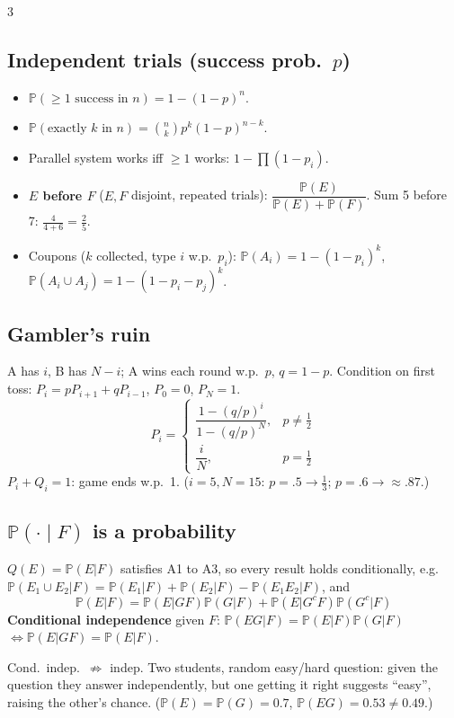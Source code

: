 \documentclass[8pt]{extarticle}
\newcommand{\PP}{\mathbb{P}}
\begin{document}
\begin{multicols*}{3}
\subsection{Independent trials (success prob.\ $p$)}
\begin{itemize}
\item $\PP(\ge1\text{ success in }n)=1-(1-p)^n$.
\item $\PP(\text{exactly }k\text{ in }n)=\binom nk p^k(1-p)^{n-k}$.
\item Parallel system works iff $\ge1$ works: $1-\prod(1-p_i)$.
\item \textbf{$E$ before $F$} ($E,F$ disjoint, repeated trials): $\dfrac{\PP(E)}{\PP(E)+\PP(F)}$. Sum 5 before 7: $\frac{4}{4+6}=\frac25$.
\item Coupons ($k$ collected, type $i$ w.p.\ $p_i$): $\PP(A_i)=1-(1-p_i)^k$, $\PP(A_i\cup A_j)=1-(1-p_i-p_j)^k$.
\end{itemize}

\subsection{Gambler's ruin}
A has $i$, B has $N-i$; A wins each round w.p.\ $p$, $q=1-p$. Condition on first toss: $P_i=pP_{i+1}+qP_{i-1}$, $P_0=0$, $P_N=1$.
\[P_i=\begin{cases}\dfrac{1-(q/p)^i}{1-(q/p)^N},&p\ne\tfrac12\\[4pt]\dfrac iN,&p=\tfrac12\end{cases}\]
$P_i+Q_i=1$: game ends w.p.\ 1. ($i=5,N=15$: $p=.5\to\frac13$; $p=.6\to\approx.87$.)

\subsection{$\PP(\cdot\mid F)$ is a probability}
$Q(E)=\PP(E|F)$ satisfies A1 to A3, so every result holds conditionally, e.g.\ $\PP(E_1\cup E_2|F)=\PP(E_1|F)+\PP(E_2|F)-\PP(E_1E_2|F)$, and
\[\PP(E|F)=\PP(E|GF)\PP(G|F)+\PP(E|G^cF)\PP(G^c|F)\]
\textbf{Conditional independence} given $F$: $\PP(EG|F)=\PP(E|F)\PP(G|F)$ $\iff\PP(E|GF)=\PP(E|F)$.
\begin{idea}Cond.\ indep.\ $\not\Rightarrow$ indep. Two students, random easy/hard question: given the question they answer independently, but one getting it right suggests ``easy'', raising the other's chance. ($\PP(E)=\PP(G)=0.7$, $\PP(EG)=0.53\ne0.49$.)\end{idea}


\end{multicols*}
\end{document}
